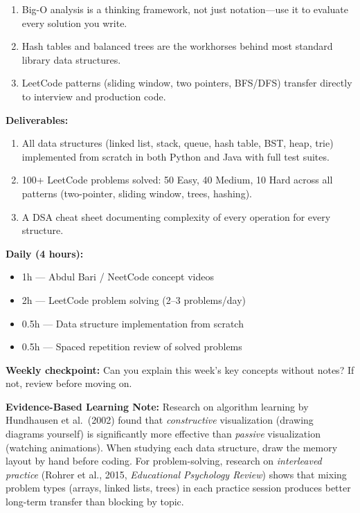 \documentclass[11pt, a4paper, oneside]{report}
\begin{document}
\begin{takeawaybox}
\begin{enumerate}[leftmargin=*]
\item Big-O analysis is a thinking framework, not just notation---use it to evaluate every solution you write.
\item Hash tables and balanced trees are the workhorses behind most standard library data structures.
\item LeetCode patterns (sliding window, two pointers, BFS/DFS) transfer directly to interview and production code.
\end{enumerate}
\end{takeawaybox}

\begin{milestonebox}
\textbf{Deliverables:}
\begin{enumerate}[leftmargin=*]
\item All data structures (linked list, stack, queue, hash table, BST, heap, trie) implemented from scratch in both Python and Java with full test suites.
\item 100+ LeetCode problems solved: 50 Easy, 40 Medium, 10 Hard across all patterns (two-pointer, sliding window, trees, hashing).
\item A DSA cheat sheet documenting complexity of every operation for every structure.
\end{enumerate}
\end{milestonebox}

\begin{practicebox}
\textbf{Daily (4 hours):}
\begin{itemize}[leftmargin=*]
\item 1h --- Abdul Bari / NeetCode concept videos
\item 2h --- LeetCode problem solving (2--3 problems/day)
\item 0.5h --- Data structure implementation from scratch
\item 0.5h --- Spaced repetition review of solved problems
\end{itemize}


\textbf{Weekly checkpoint:} Can you explain this week's key concepts without notes? If not, review before moving on.

\textbf{Evidence-Based Learning Note:} Research on algorithm learning by Hundhausen et al.\ (2002) found that \emph{constructive} visualization (drawing diagrams yourself) is significantly more effective than \emph{passive} visualization (watching animations). When studying each data structure, draw the memory layout by hand before coding. For problem-solving, research on \emph{interleaved practice} (Rohrer et al., 2015, \emph{Educational Psychology Review}) shows that mixing problem types (arrays, linked lists, trees) in each practice session produces better long-term transfer than blocking by topic.

\end{practicebox}
\end{document}
